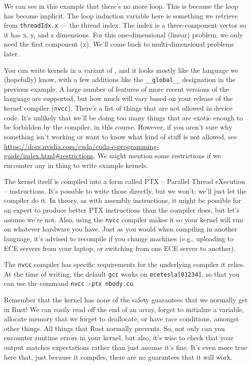 We can see in this example that there's no more loop. This is because the loop has become implicit. The loop induction variable here is something we retrieve from \texttt{threadIdx.x} --- the thread index. The index is a three-component vector so it has x, y, and z dimensions. For this one-dimensional (linear) problem, we only need the first component (x). We'll come back to multi-dimensional problems later.

You can write kernels in a variant of \CPP, and it looks mostly like the language we (hopefully) know, with a few additions like the \texttt{\_\_global\_\_} designation in the previous example. A large number of features of more recent versions of the language are supported, but how much will vary based on your release of the kernel compiler (\texttt{nvcc}). There's a list of things that are not allowed in device code. It's unlikely that we'll be doing too many things that are exotic enough to be forbidden by the compiler, in this course. However, if you aren't sure why something isn't working or want to know what kind of stuff is not allowed, see \url{https://docs.nvidia.com/cuda/cuda-c-programming-guide/index.html#restrictions}. We might mention some restrictions if we encounter any in thing to write example kernels.

The kernel itself is compiled into a form called PTX -- Parallel Thread eXecution -- instructions. It's possible to write those directly, but we won't; we'll just let the compiler do it. In theory, as with assembly instructions, it might be possible for an expert to produce better PTX instructions than the compiler does, but let's assume we're not. Also, using the \texttt{nvcc} compiler makes it so your kernel will run on whatever hardware you have. Just as you would when compiling in another language, it's advised to recompile if you change machines (e.g., uploading to ECE servers from your laptop, or switching from one ECE server to another).

The \texttt{nvcc} compiler has specific requirements for the underlying compiler it relies. At the time of writing, the default \texttt{gcc} works on \texttt{ecetesla[01234]}, so that you can use the command \texttt{nvcc -ptx nbody.cu}.

Remember that the kernel has none of the safety guarantees that we normally get in Rust! We can easily read off the end of an array, forget to initialize a variable, allocate memory that we forget to deallocate, or have race conditions, amongst other things. All things that Rust normally prevents. So, not only can you encounter runtime errors in your kernel, but also, it's wise to check that your output matches expectations rather than just assume it's fine. It's even more true here that, just because it compiles, there are no guarantees that it will work.

